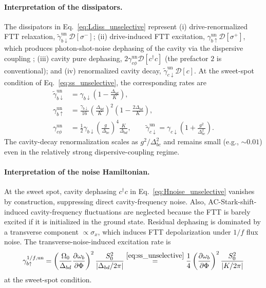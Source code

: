 \paragraph{Interpretation of the dissipators.}
The dissipators in Eq.~\eqref{eq:Ldiss_unselective} represent (i) drive-renormalized FTT relaxation,
$\widetilde{\gamma}_{b\downarrow}^{\mathrm{un}}\mathcal{D}[\sigma^-]$; (ii) drive-induced FTT excitation,
$\gamma_{b\uparrow}^{\mathrm{un}}\mathcal{D}[\sigma^+]$, which produces photon-shot-noise dephasing of the cavity via the dispersive coupling \cite{shotnoise,PhysRevA.75.042302Ashphotonshot}; (iii) cavity pure dephasing,
$2\gamma_{c\phi}^{\mathrm{un}}\mathcal{D}[c^\dagger c]$ (the prefactor $2$ is conventional); and (iv) renormalized cavity decay,
$\widetilde{\gamma}_{c\downarrow}^{\mathrm{un}}\mathcal{D}[c]$.
At the sweet-spot condition of Eq.~\eqref{eq:ss_unselective}, the corresponding rates are
\begin{align}
\widetilde{\gamma}_{b\downarrow}^{\mathrm{un}}
&= \gamma_{b\downarrow}\left(1-\frac{\Delta_{bd}}{K}\right), \nonumber\\
\gamma_{b\uparrow}^{\mathrm{un}}
&= \frac{\gamma_{b\downarrow}}{16}\left(\frac{\Delta_{bd}}{K}\right)^2
\left(1-\frac{2\Delta_{bd}}{K}\right), \nonumber\\
\gamma_{c\phi}^{\mathrm{un}}
&= \frac{1}{2}\gamma_{b\downarrow}\left(\frac{g}{\Delta_{bc}}\right)^4\frac{K}{\Delta_{bd}}, \qquad
\widetilde{\gamma}_{c\downarrow}^{\mathrm{un}}
= \gamma_{c\downarrow}\left(1+\frac{g^2}{\Delta_{bc}^2}\right).
\end{align}
The cavity-decay renormalization scales as $g^2/\Delta_{bc}^2$ and remains small (e.g., $\sim 0.01$) even in the relatively strong dispersive-coupling regime.

\paragraph{Interpretation of the noise Hamiltonian.}
At the sweet spot, cavity dephasing $c^\dagger c$ in Eq.~\eqref{eq:Hnoise_unselective} vanishes by construction, suppressing direct cavity-frequency noise. Also, AC-Stark-shift-induced cavity-frequency fluctuations are neglected because the FTT is barely excited if it is initialized in the ground state. Residual dephasing is dominated by a transverse component $\propto\sigma_x$, which induces FTT depolarization under $1/f$ flux noise. The transverse-noise-induced excitation rate is
\begin{equation}
\gamma_{b\uparrow}^{1/f,\mathrm{un}}=\left(\frac{\Omega_0}{\Delta_{bd}}\frac{\partial\omega_b}{\partial\Phi}\right)^2\frac{S_0^2}{|\Delta_{bd}/2\pi|}
\overset{\eqref{eq:ss_unselective}}{=}\frac{1}{4}\left(\frac{\partial\omega_b}{\partial\Phi}\right)^2\frac{S_0^2}{|K/2\pi|}
\end{equation}
at the sweet-spot condition.

